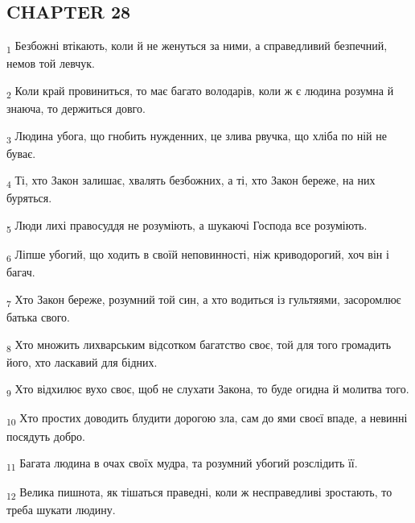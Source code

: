 \subsection{CHAPTER 28}
\begin{tcolorbox}
\textsubscript{1} Безбожні втікають, коли й не женуться за ними, а справедливий безпечний, немов той левчук.
\end{tcolorbox}
\begin{tcolorbox}
\textsubscript{2} Коли край провиниться, то має багато володарів, коли ж є людина розумна й знаюча, то держиться довго.
\end{tcolorbox}
\begin{tcolorbox}
\textsubscript{3} Людина убога, що гнобить нужденних, це злива рвучка, що хліба по ній не буває.
\end{tcolorbox}
\begin{tcolorbox}
\textsubscript{4} Ті, хто Закон залишає, хвалять безбожних, а ті, хто Закон береже, на них буряться.
\end{tcolorbox}
\begin{tcolorbox}
\textsubscript{5} Люди лихі правосуддя не розуміють, а шукаючі Господа все розуміють.
\end{tcolorbox}
\begin{tcolorbox}
\textsubscript{6} Ліпше убогий, що ходить в своїй неповинності, ніж криводорогий, хоч він і багач.
\end{tcolorbox}
\begin{tcolorbox}
\textsubscript{7} Хто Закон береже, розумний той син, а хто водиться із гультяями, засоромлює батька свого.
\end{tcolorbox}
\begin{tcolorbox}
\textsubscript{8} Хто множить лихварським відсотком багатство своє, той для того громадить його, хто ласкавий для бідних.
\end{tcolorbox}
\begin{tcolorbox}
\textsubscript{9} Хто відхилює вухо своє, щоб не слухати Закона, то буде огидна й молитва того.
\end{tcolorbox}
\begin{tcolorbox}
\textsubscript{10} Хто простих доводить блудити дорогою зла, сам до ями своєї впаде, а невинні посядуть добро.
\end{tcolorbox}
\begin{tcolorbox}
\textsubscript{11} Багата людина в очах своїх мудра, та розумний убогий розслідить її.
\end{tcolorbox}
\begin{tcolorbox}
\textsubscript{12} Велика пишнота, як тішаться праведні, коли ж несправедливі зростають, то треба шукати людину.
\end{tcolorbox}
